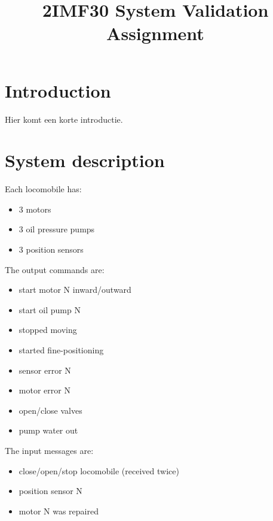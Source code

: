 \documentclass{article}
\title{2IMF30 System Validation Assignment}
\begin{document}
\section{Introduction}
Hier komt een korte introductie.

\section{System description}
Each locomobile has:
\begin{itemize}
    \item 3 motors
    \item 3 oil pressure pumps
    \item 3 position sensors
\end{itemize}
The output commands are:
\begin{itemize}
    \item start motor N inward/outward
    \item start oil pump N

    \item stopped moving
    \item started fine-positioning
    \item sensor error N
    \item motor error N

    \item open/close valves
    \item pump water out
\end{itemize}
The input messages are:
\begin{itemize}
    \item close/open/stop locomobile (received twice)
    \item position sensor N
    \item motor N was repaired
\end{itemize}
\end{document}
